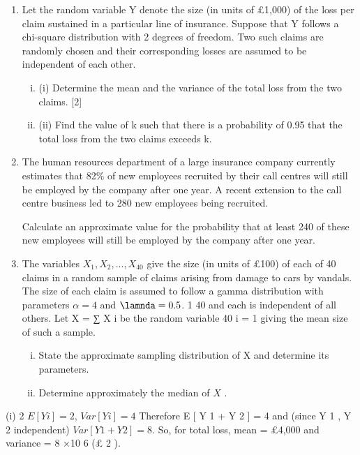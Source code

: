 \documentclass[a4paper,12pt]{article}
\begin{document}
\begin{enumerate}
\item 
Let the random variable Y denote the size (in units of £1,000) of the loss per claim sustained in a particular line of insurance. Suppose that Y follows a chi-square distribution with 2 degrees of freedom. Two such claims are randomly chosen and
their corresponding losses are assumed to be independent of each other.
\begin{enumerate}[(i)]
\item (i) Determine the mean and the variance of the total loss from the two claims. [2]
\item (ii) Find the value of k such that there is a probability of 0.95 that the total loss from the two claims exceeds k.
\end{enumerate}
\item 
The human resources department of a large insurance company currently estimates that 82\% of new employees recruited by their call centres will still be employed by the company after one year. A recent extension to the call centre business led to 280
new employees being recruited.

Calculate an approximate value for the probability that at least 240 of these new employees will still be employed by the company after one year.
\item The variables $X_1 , X_2 , ..., X_{40}$ give the size (in units of £100) of each of 40 claims in a random sample of claims arising from damage to cars by vandals. The size of each claim is assumed to follow a gamma distribution with parameters $\alpha = 4$ and $\lamnda = 0.5$.
1 40
and each is independent of all others. Let X =
∑ X i be the random variable
40 i = 1
giving the mean size of such a sample.
\begin{enumerate}[(i)]
\item 
State the approximate sampling distribution of X and determine its parameters.
\item 
Determine approximately the median of $X$ .
\end{enumerate}
\end{enumerate}
(i)
2
$E [ Y i ] = 2$, $Var [ Y i ] = 4$
Therefore E [ Y 1 + Y 2 ] = 4 and (since Y 1 , Y 2 independent) $Var [ Y 1 + Y 2 ] = 8$.
So, for total loss, mean = £4,000 and variance = 8 ×10 6 (£ 2 ).
\end{document}
